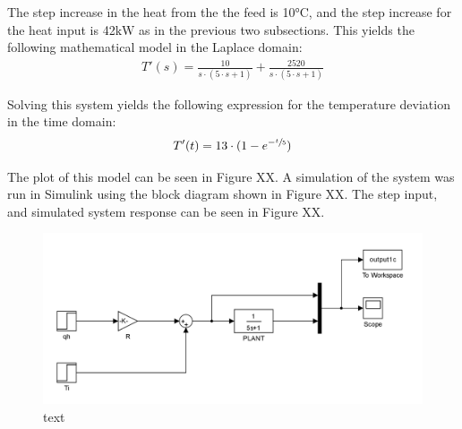 \documentclass{article}
\begin{document}
The step increase in the heat from the the feed is 10$\si{\degreeCelsius}$, and the step increase for the heat input is 42$\si{\kilo\watt}$ as in the previous two subsections. This yields the following mathematical model in the Laplace domain:
\begin{align}
T'(s) = \frac{10}{s \cdot (5 \cdot s + 1)} + \frac{2520}{s \cdot (5 \cdot s + 1)}
\end{align}

Solving this system yields the following expression for the temperature deviation in the time domain:
\begin{align}
T'(t) = 13 \cdot (1 - e^{-\sfrac{t}{5}})
\end{align}

The plot of this model can be seen in Figure XX. A simulation of the system was run in Simulink using the block diagram shown in Figure XX. The step input, and simulated system response can be seen in Figure XX.

\begin{figure}[h]
\centering
\includegraphics[scale=0.2]{block_1c}
\caption{text}
\end{figure}
\end{document}

